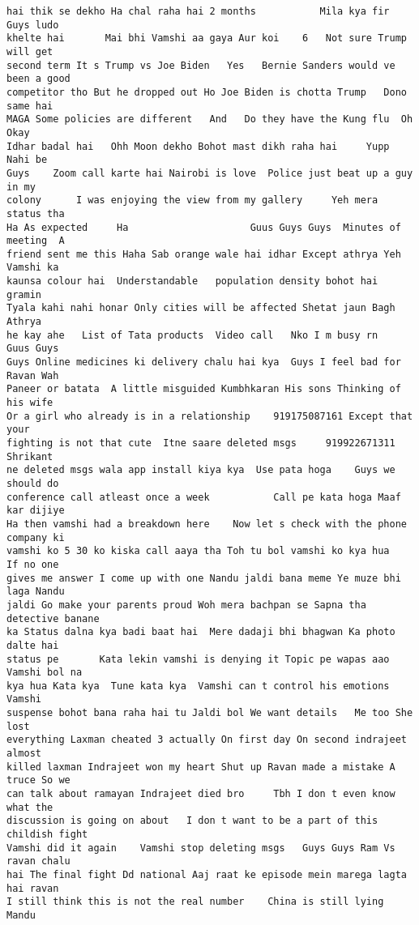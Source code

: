 \documentclass[11pt]{article}
\begin{document}
\begin{tcolorbox}[breakable, size=fbox, boxrule=.5pt, pad at break*=1mm, opacityfill=0]
\begin{Verbatim}[commandchars=\\\{\}]
hai thik se dekho Ha chal raha hai 2 months           Mila kya fir  Guys ludo
khelte hai       Mai bhi Vamshi aa gaya Aur koi    6   Not sure Trump will get
second term It s Trump vs Joe Biden   Yes   Bernie Sanders would ve been a good
competitor tho But he dropped out Ho Joe Biden is chotta Trump   Dono same hai
MAGA Some policies are different   And   Do they have the Kung flu  Oh Okay
Idhar badal hai   Ohh Moon dekho Bohot mast dikh raha hai     Yupp Nahi be
Guys    Zoom call karte hai Nairobi is love  Police just beat up a guy in my
colony      I was enjoying the view from my gallery     Yeh mera status tha
Ha As expected     Ha                     Guus Guys Guys  Minutes of meeting  A
friend sent me this Haha Sab orange wale hai idhar Except athrya Yeh Vamshi ka
kaunsa colour hai  Understandable   population density bohot hai     gramin
Tyala kahi nahi honar Only cities will be affected Shetat jaun Bagh      Athrya
he kay ahe   List of Tata products  Video call   Nko I m busy rn   Guus Guys
Guys Online medicines ki delivery chalu hai kya  Guys I feel bad for Ravan Wah
Paneer or batata  A little misguided Kumbhkaran His sons Thinking of his wife
Or a girl who already is in a relationship    919175087161 Except that your
fighting is not that cute  Itne saare deleted msgs     919922671311   Shrikant
ne deleted msgs wala app install kiya kya  Use pata hoga    Guys we should do
conference call atleast once a week           Call pe kata hoga Maaf kar dijiye
Ha then vamshi had a breakdown here    Now let s check with the phone company ki
vamshi ko 5 30 ko kiska call aaya tha Toh tu bol vamshi ko kya hua   If no one
gives me answer I come up with one Nandu jaldi bana meme Ye muze bhi laga Nandu
jaldi Go make your parents proud Woh mera bachpan se Sapna tha detective banane
ka Status dalna kya badi baat hai  Mere dadaji bhi bhagwan Ka photo dalte hai
status pe       Kata lekin vamshi is denying it Topic pe wapas aao Vamshi bol na
kya hua Kata kya  Tune kata kya  Vamshi can t control his emotions Vamshi
suspense bohot bana raha hai tu Jaldi bol We want details   Me too She lost
everything Laxman cheated 3 actually On first day On second indrajeet almost
killed laxman Indrajeet won my heart Shut up Ravan made a mistake A truce So we
can talk about ramayan Indrajeet died bro     Tbh I don t even know what the
discussion is going on about   I don t want to be a part of this childish fight
Vamshi did it again    Vamshi stop deleting msgs   Guys Guys Ram Vs ravan chalu
hai The final fight Dd national Aaj raat ke episode mein marega lagta hai ravan
I still think this is not the real number    China is still lying    Mandu

\end{Verbatim}
\end{tcolorbox}
\end{document}
